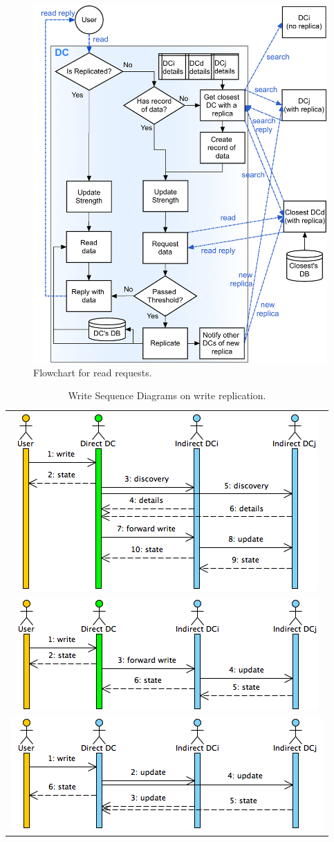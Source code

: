 \documentclass{acm_proc_article-sp}
\begin{document}
\begin{figure}[ht!]
	\includegraphics[width=.47\textwidth]{figures/readRequestFlowchart.png}

	\caption{Flowchart for read requests.}
	\label{fig:read_flowchart}
\end{figure}
\begin{table}[ht!]
	\begin{center}
		\begin{tabular}{c}
			\includegraphics[width=.46\textwidth]{figures/firstWriteWithoutReplica.png} \\
			\includegraphics[width=.47\textwidth]{figures/writeWithoutReplica.png} \\
			\includegraphics[width=.47\textwidth]{figures/writeWithReplica.png}
		\end{tabular}
		
		\caption{Write Sequence Diagrams on write replication.}
		\label{tb:write_sequence_diagrams}
	\end{center}
\end{table}
\end{document}
